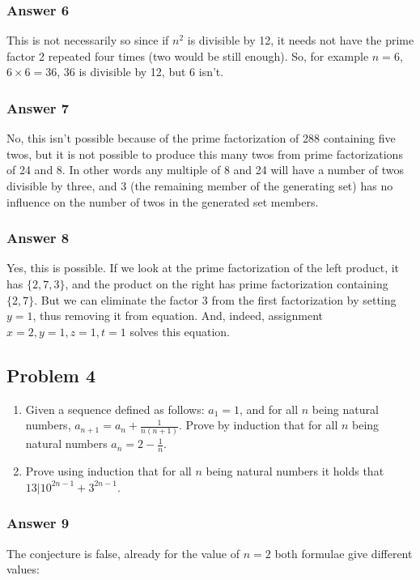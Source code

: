 \documentclass[11pt]{article}
\begin{document}
\subsubsection{Answer 6}
\label{sec-1-3-2}
This is not necessarily so since if $n^2$ is divisible by 12, it needs
not have the prime factor 2 repeated four times (two would be still enough).
So, for example $n=6$, $6\times6=36$, 36 is divisible by 12, but 6 isn't.
\subsubsection{Answer 7}
\label{sec-1-3-3}
No, this isn't possible because of the prime factorization of 288 containing
five twos, but it is not possible to produce this many twos from prime
factorizations of 24 and 8.  In other words any multiple of 8 and 24 will
have a number of twos divisible by three, and 3 (the remaining member of
the generating set) has no influence on the number of twos in the generated
set members.
\subsubsection{Answer 8}
\label{sec-1-3-4}
Yes, this is possible.  If we look at the prime factorization of the
left product, it has $\{2, 7, 3\}$, and the product on the right has
prime factorization containing $\{2, 7\}$.  But we can eliminate the
factor 3 from the first factorization by setting $y=1$, thus removing
it from equation.  And, indeed, assignment $x=2, y=1, z=1, t=1$ solves
this equation.
\subsection{Problem 4}
\label{sec-1-4}
\begin{enumerate}
\item Given a sequence defined as follows:
$a_1=1$, and for all $n$ being natural numbers,
$a_{n+1}=a_n+\frac{1}{n(n+1)}$.  Prove by induction that for all $n$
being natural numbers $a_n = 2 - \frac{1}{n}$.
\item Prove using induction that for all $n$ being natural numbers it holds
that $13|10^{2n-1}+3^{2n-1}$.
\end{enumerate}

\subsubsection{Answer 9}
\label{sec-1-4-1}
The conjecture is false, already for the value of $n=2$ both formulae give
different values:
\end{document}
